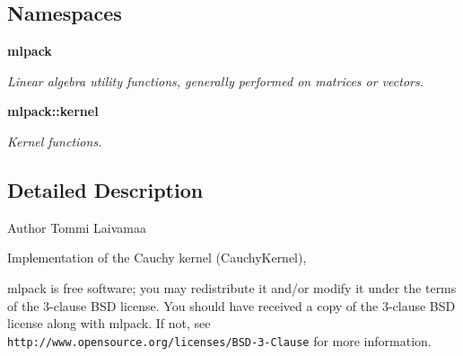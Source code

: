 \subsection*{Namespaces}
\begin{DoxyCompactItemize}
\item 
 \textbf{ mlpack}
\begin{DoxyCompactList}\small\item\em Linear algebra utility functions, generally performed on matrices or vectors. \end{DoxyCompactList}\item 
 \textbf{ mlpack\+::kernel}
\begin{DoxyCompactList}\small\item\em Kernel functions. \end{DoxyCompactList}\end{DoxyCompactItemize}


\subsection{Detailed Description}
\begin{DoxyAuthor}{Author}
Tommi Laivamaa
\end{DoxyAuthor}
Implementation of the Cauchy kernel (Cauchy\+Kernel),

mlpack is free software; you may redistribute it and/or modify it under the terms of the 3-\/clause B\+SD license. You should have received a copy of the 3-\/clause B\+SD license along with mlpack. If not, see {\tt http\+://www.\+opensource.\+org/licenses/\+B\+S\+D-\/3-\/\+Clause} for more information. 
